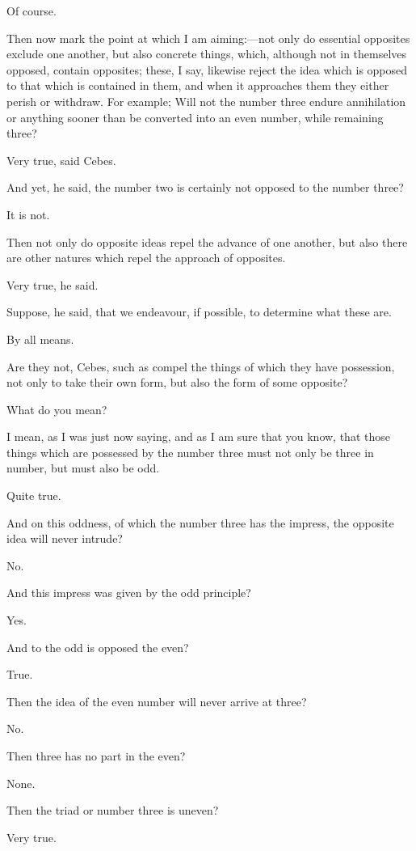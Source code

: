 Of course.

Then now mark the point at which I am aiming:—not only do essential
opposites exclude one another, but also concrete things, which, although
not in themselves opposed, contain opposites; these, I say, likewise
reject the idea which is opposed to that which is contained in them, and
when it approaches them they either perish or withdraw. For example; Will
not the number three endure annihilation or anything sooner than be
converted into an even number, while remaining three?

Very true, said Cebes.

And yet, he said, the number two is certainly not opposed to the number
three?

It is not.

Then not only do opposite ideas repel the advance of one another, but also
there are other natures which repel the approach of opposites.

Very true, he said.

Suppose, he said, that we endeavour, if possible, to determine what these
are.

By all means.

Are they not, Cebes, such as compel the things of which they have
possession, not only to take their own form, but also the form of some
opposite?

What do you mean?

I mean, as I was just now saying, and as I am sure that you know, that
those things which are possessed by the number three must not only be
three in number, but must also be odd.

Quite true.

And on this oddness, of which the number three has the impress, the
opposite idea will never intrude?

No.

And this impress was given by the odd principle?

Yes.

And to the odd is opposed the even?

True.

Then the idea of the even number will never arrive at three?

No.

Then three has no part in the even?

None.

Then the triad or number three is uneven?

Very true.

